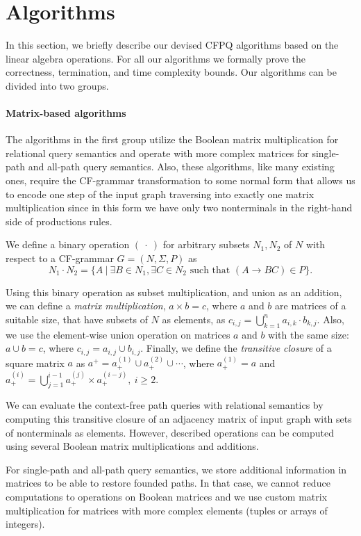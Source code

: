 \documentclass[sigconf, nonacm]{acmart}
\begin{document}
\section{Algorithms}
 In this section, we briefly describe our devised CFPQ algorithms based on the linear algebra operations. For all our algorithms we formally prove the correctness, termination, and time complexity bounds. Our algorithms can be divided into two groups. 
 
 \paragraph{Matrix-based algorithms}
 The algorithms in the first group utilize the Boolean matrix multiplication for relational query semantics and operate with more complex matrices for single-path and all-path query semantics. Also, these algorithms, like many existing ones, require the CF-grammar transformation to some normal form that allows us to encode one step of the input graph traversing into exactly one matrix multiplication since in this form we have only two nonterminals in the right-hand side of productions rules.
 
We define a binary operation $(~\cdot~)$ for arbitrary subsets \mbox{$N_1, N_2$} of $N$ with respect to a CF-grammar \mbox{$G = (N, \Sigma, P)$} as
$$N_1 \cdot N_2 = \{A~|~\exists B \in N_1, \exists C \in N_2 \text{ such that }(A \rightarrow B C) \in P\}.$$

Using this binary operation as subset multiplication, and union as an addition, we can define a \emph{matrix multiplication}, \mbox{$a \times b = c$}, where $a$ and $b$ are matrices of a suitable size, that have subsets of $N$ as elements, as $c_{i,j} = \bigcup^{n}_{k=1}{a_{i,k} \cdot b_{k,j}}$. Also, we use the element-wise union operation on matrices $a$ and $b$ with the same size: \mbox{$a \cup b = c$}, where $c_{i,j} = a_{i,j} \cup b_{i,j}.$ Finally, we define the \emph{transitive closure} of a square matrix $a$ as \mbox{$a^+ = a^{(1)}_+ \cup a^{(2)}_+ \cup \cdots$}, where \mbox{$a^{(1)}_+ = a$} and $a^{(i)}_+ = \bigcup^{i-1}_{j=1}{a^{(j)}_+ \times a^{(i-j)}_+}, ~i \ge 2$.

We can evaluate the context-free path queries with relational semantics by computing this transitive closure of an adjacency matrix of input graph with sets of nonterminals as elements. However, described operations can be computed using several Boolean matrix multiplications and additions.

For single-path and all-path query semantics, we store additional information in matrices to be able to restore founded paths. In that case, we cannot reduce computations to operations on Boolean matrices and we use custom matrix multiplication for matrices with more complex elements (tuples or arrays of integers).
\end{document}
